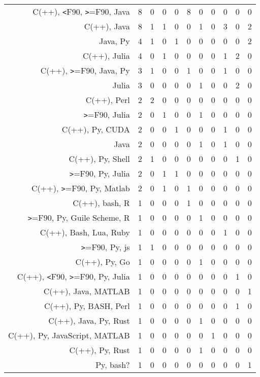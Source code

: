 {\begin{landscape}
\begin{longtable}[htb]{r|c|c|c|c|c|c|c|c|c|c}
{C(++), \verb!<!F90, \verb!>!=F90, Java} & 8 & 0 & 0 & 0 & 8 & 0 & 0 & 0 & 0 & 0 \\%
{C(++), Java} & 8 & 1 & 1 & 0 & 0 & 1 & 0 & 3 & 0 & 2 \\%
{Java, Py} & 4 & 1 & 0 & 1 & 0 & 0 & 0 & 0 & 0 & 2 \\%
{C(++), Julia} & 4 & 0 & 1 & 0 & 0 & 0 & 0 & 1 & 2 & 0 \\%
{C(++), \verb!>!=F90, Java, Py} & 3 & 1 & 0 & 0 & 1 & 0 & 0 & 1 & 0 & 0 \\%
{Julia} & 3 & 0 & 0 & 0 & 0 & 1 & 0 & 0 & 2 & 0 \\%
{C(++), Perl} & 2 & 2 & 0 & 0 & 0 & 0 & 0 & 0 & 0 & 0 \\%
{\verb!>!=F90, Julia} & 2 & 0 & 1 & 0 & 0 & 1 & 0 & 0 & 0 & 0 \\%
{C(++), Py, CUDA} & 2 & 0 & 0 & 1 & 0 & 0 & 0 & 1 & 0 & 0 \\%
{Java} & 2 & 0 & 0 & 0 & 0 & 1 & 0 & 1 & 0 & 0 \\%
{C(++), Py, Shell} & 2 & 1 & 0 & 0 & 0 & 0 & 0 & 0 & 1 & 0 \\%
{\verb!>!=F90, Py, Julia} & 2 & 0 & 1 & 1 & 0 & 0 & 0 & 0 & 0 & 0 \\%
{C(++), \verb!>!=F90, Py, Matlab} & 2 & 0 & 1 & 0 & 1 & 0 & 0 & 0 & 0 & 0 \\%
{C(++), bash, R} & 1 & 0 & 0 & 0 & 1 & 0 & 0 & 0 & 0 & 0 \\%
{\verb!>!=F90, Py, Guile Scheme, R} & 1 & 0 & 0 & 0 & 0 & 1 & 0 & 0 & 0 & 0 \\%
{C(++), Bash, Lua, Ruby} & 1 & 0 & 0 & 0 & 0 & 0 & 0 & 1 & 0 & 0 \\%
{\verb!>!=F90, Py, js} & 1 & 1 & 0 & 0 & 0 & 0 & 0 & 0 & 0 & 0 \\%
{C(++), Py, Go} & 1 & 0 & 0 & 0 & 0 & 1 & 0 & 0 & 0 & 0 \\%
{C(++), \verb!<!F90, \verb!>!=F90, Py, Julia} & 1 & 0 & 0 & 0 & 0 & 0 & 0 & 0 & 1 & 0 \\%
{C(++), Java, MATLAB} & 1 & 0 & 0 & 0 & 0 & 0 & 0 & 0 & 0 & 1 \\%
{C(++), Py, BASH, Perl} & 1 & 0 & 0 & 0 & 0 & 0 & 0 & 0 & 1 & 0 \\%
{C(++), Java, Py, Rust} & 1 & 0 & 0 & 0 & 0 & 1 & 0 & 0 & 0 & 0 \\%
{C(++), Py, JavaScript, MATLAB} & 1 & 0 & 0 & 0 & 0 & 0 & 1 & 0 & 0 & 0 \\%
{C(++), Py, Rust} & 1 & 0 & 0 & 0 & 0 & 1 & 0 & 0 & 0 & 0 \\%
{Py, bash?} & 1 & 0 & 0 & 0 & 0 & 0 & 0 & 0 & 0 & 1 \\%

\end{longtable}
\end{landscape}}
